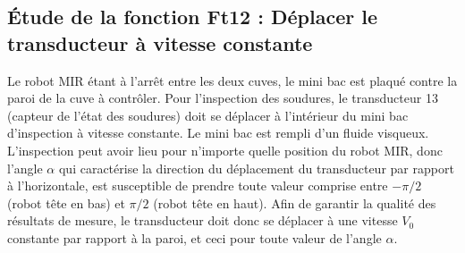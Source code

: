 \documentclass[10pt,fleqn]{article} %
\newif\ifcolle
\begin{document}
\begin{multicols}{2}
%
%
%
%
%
%
%

\subsection*{Étude de la fonction Ft12 : Déplacer le transducteur à vitesse constante}
\ifcolle
\else
Le robot MIR étant à l’arrêt entre les deux cuves, le mini bac est plaqué contre la paroi de la cuve à contrôler. Pour l’inspection des soudures, le transducteur 13 (capteur de l’état des soudures) doit se déplacer à l’intérieur du mini bac d’inspection à vitesse constante. Le mini bac est rempli d’un fluide visqueux. L’inspection peut avoir lieu pour n’importe quelle position du robot MIR, donc l’angle $\alpha$ qui caractérise la direction du déplacement du transducteur par rapport à l’horizontale, est susceptible de prendre toute valeur comprise entre $-\pi/2$ (robot tête en bas) et $\pi/2$ (robot tête en haut). Afin de garantir la qualité des résultats de mesure, le transducteur doit donc se déplacer à une vitesse $V_0$ constante par rapport à la paroi, et ceci pour toute valeur de l’angle $\alpha$.
\fi


\end{multicols}
\end{document}
